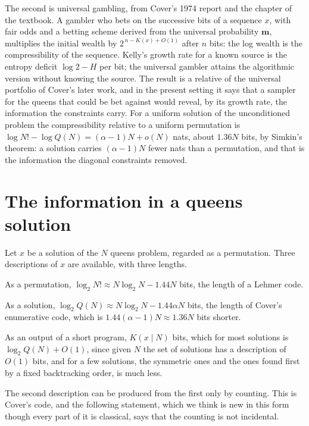 The second is universal gambling, from Cover's 1974 report \cite{Cover1974} and the chapter of the textbook. A gambler who bets on the successive bits of a sequence $x$, with fair odds and a betting scheme derived from the universal probability $\mathbf{m}$, multiplies the initial wealth by $2^{\,n - K(x) + O(1)}$ after $n$ bits: the log wealth is the compressibility of the sequence. Kelly's growth rate for a known source is the entropy deficit $\log 2 - H$ per bit; the universal gambler attains the algorithmic version without knowing the source. The result is a relative of the universal portfolio of Cover's later work, and in the present setting it says that a sampler for the queens that could be bet against would reveal, by its growth rate, the information the constraints carry. For a uniform solution of the unconditioned problem the compressibility relative to a uniform permutation is $\log N! - \log Q(N) = (\alpha - 1) N + o(N)$ nats, about $1.36 N$ bits, by Simkin's theorem: a solution carries $(\alpha - 1) N$ fewer nats than a permutation, and that is the information the diagonal constraints removed.

\section{The information in a queens solution}

Let $x$ be a solution of the $N$ queens problem, regarded as a permutation. Three descriptions of $x$ are available, with three lengths.

As a permutation, $\log_2 N! \approx N \log_2 N - 1.44 N$ bits, the length of a Lehmer code.

As a solution, $\log_2 Q(N) \approx N \log_2 N - 1.44 \alpha N$ bits, the length of Cover's enumerative code, which is $1.44 (\alpha - 1) N \approx 1.36 N$ bits shorter.

As an output of a short program, $K(x \mid N)$ bits, which for most solutions is $\log_2 Q(N) + O(1)$, since given $N$ the set of solutions has a description of $O(1)$ bits, and for a few solutions, the symmetric ones and the ones found first by a fixed backtracking order, is much less.

The second description can be produced from the first only by counting. This is Cover's code, and the following statement, which we think is new in this form though every part of it is classical, says that the counting is not incidental.

